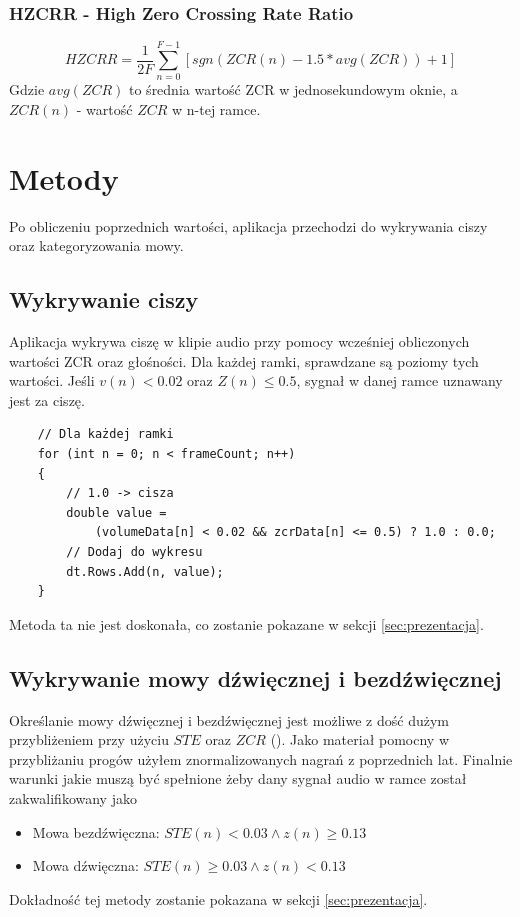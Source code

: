 \documentclass[12pt,a4paper]{article}
\begin{document}
\subsubsection{HZCRR - High Zero Crossing Rate Ratio\label{sec:hzcrr}}
\begin{equation}
    HZCRR=\frac{1}{2F}\sum_{n=0}^{F-1}[
        sgn(ZCR(n)-1.5*avg(ZCR))+1
    ]
\end{equation}
Gdzie $avg(ZCR)$ to średnia wartość ZCR w jednosekundowym oknie, a $ZCR(n)$ - wartość $ZCR$ w n-tej
ramce.

\section{Metody\label{sec:metody}}
Po obliczeniu poprzednich wartości, aplikacja przechodzi do wykrywania ciszy oraz kategoryzowania
mowy.

\subsection{Wykrywanie ciszy\label{sec:silent}}
Aplikacja wykrywa ciszę w klipie audio przy pomocy wcześniej obliczonych wartości ZCR oraz
głośności. Dla każdej ramki, sprawdzane są poziomy tych wartości. Jeśli
$v(n) < 0.02$ oraz $Z(n) \le 0.5$, sygnał w danej ramce uznawany jest za ciszę.
\begin{verbatim}
    // Dla każdej ramki
    for (int n = 0; n < frameCount; n++)
    {
        // 1.0 -> cisza
        double value =
            (volumeData[n] < 0.02 && zcrData[n] <= 0.5) ? 1.0 : 0.0;
        // Dodaj do wykresu
        dt.Rows.Add(n, value);
    }
\end{verbatim}
Metoda ta nie jest doskonała, co zostanie pokazane w sekcji \ref{sec:prezentacja}.

\subsection{Wykrywanie mowy dźwięcznej i bezdźwięcznej\label{sec:mowa}}
Określanie mowy dźwięcznej i bezdźwięcznej jest możliwe z dość dużym przybliżeniem przy użyciu $STE$
oraz $ZCR$ (\citep{bachu08}). Jako materiał pomocny w przybliżaniu progów użyłem znormalizowanych
nagrań z poprzednich lat. Finalnie warunki jakie muszą być spełnione żeby dany sygnał audio w ramce
został zakwalifikowany jako
\begin{itemize}
    \item Mowa bezdźwięczna: $STE(n)<0.03 \land z(n) \ge 0.13$
    \item Mowa dźwięczna: $STE(n)\ge0.03 \land z(n) < 0.13$
\end{itemize}
Dokładność tej metody zostanie pokazana w sekcji \ref{sec:prezentacja}.
\end{document}
